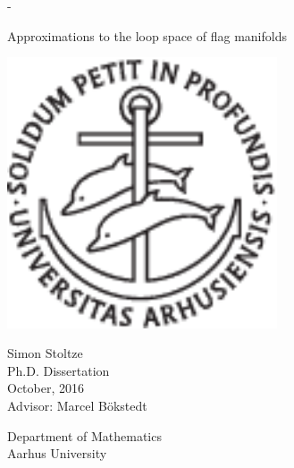 \begin{titlingpage}
  \calccentering{\unitlength}
  \begin{adjustwidth*}{\unitlength}{-\unitlength}
    \begin{adjustwidth}{-1cm}{-1cm} 
      \vspace*{2cm}
      \centering
      \scshape
      
      {\Huge Approximations to the loop\newline\newline
        space of flag manifolds} \\
      
      \vspace*{4\onelineskip}
      
      \includegraphics[width=8cm]{billeder/segla1s.pdf}    
      
      \vspace*{4\onelineskip}

      {\Large
        \linespread{1.4}\selectfont
        {\huge Simon Stoltze}\\
        Ph.D. Dissertation\\
        October, 2016 %
        \\ 
        \vspace{1em}
        Advisor: Marcel B\"okstedt}
      
      \strut\vfill
      Department of Mathematics\\
      Aarhus University
    \end{adjustwidth}
  \end{adjustwidth*}
  
\end{titlingpage}


